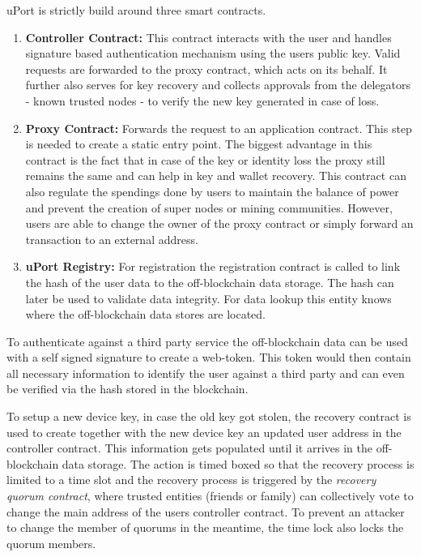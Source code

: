 \noindent uPort is strictly build around three smart contracts.
\begin{enumerate}
\item \textbf{Controller Contract:} This contract interacts with the user and handles signature based authentication mechanism using the users public key. Valid requests are forwarded to the proxy contract, which acts on its behalf. 
It further also serves for key recovery and collects approvals from the delegators - known trusted nodes - to verify the new key generated in case of loss.

\item \textbf{Proxy Contract:}
Forwards the request to an application contract. This step is needed to create a static entry point.
The biggest advantage in this contract is the fact that in case of the key or identity loss the proxy still remains the same and can help in key and wallet recovery.
This contract can also regulate the spendings done by users to maintain the balance of power and prevent the creation of super nodes or mining communities.
However, users are able to change the owner of the proxy contract or simply forward an transaction to an external address\cite[p. 6]{uPortWhitePaper}.

\item \textbf{uPort Registry:}
For registration the registration contract is called to link the hash of the user data to the off-blockchain data storage. The hash can later be used to validate data integrity. 
For data lookup this entity knows where the off-blockchain data stores are located.

\end{enumerate}

To authenticate against a third party service the off-blockchain data can be used with a self signed signature to create a web-token. This token would then contain all necessary information to identify the user against a third party and can even be verified via the hash stored in the blockchain.

To setup a new device key, in case the old key got stolen, the recovery contract is used to create together with the new device key an updated user address in the controller contract. This information gets populated until it arrives in the off-blockchain data storage. The action is timed boxed so that the recovery process is limited to a time slot and the recovery process is triggered by the \textit{recovery quorum contract}, where trusted entities (friends or family) can collectively vote to change the main address of the users controller contract. To prevent an attacker to change the member of quorums in the meantime, the time lock also locks the quorum members.

